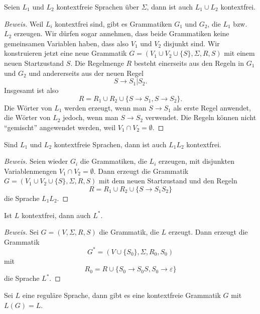 \begin{satz}[Vereinigung]
\label{satz:cfg-union}
%
Seien $L_1$ und $L_2$ kontextfreie Sprachen über $\Sigma$,
dann ist auch $L_1\cup L_2$ kontextfrei.
\end{satz}

\begin{proof}[Beweis]
Weil $L_i$ kontextfrei sind,  gibt es Grammatiken $G_1$ und $G_2$,
die $L_1$ bzw.~$L_2$ erzeugen. Wir dürfen sogar annehmen, dass
beide Grammatiken keine
gemeinsamen Variablen haben, dass also $V_1$ und $V_2$ 
disjunkt sind. Wir konstruieren jetzt eine neue Grammatik
$G=(V_1\cup V_2\cup\{S\}, \Sigma, R, S)$ mit einem neuen
Startzustand $S$. Die Regelmenge $R$ besteht einerseits aus
den Regeln in $G_1$ und $G_2$ und andererseits aus der neuen
Regel
\[
S\to S_1 | S_2.
\]
Insgesamt ist also
\[
R=R_1\cup R_2\cup \{S\to S_1, S\to S_2\}.
\]
Die Wörter von $L_1$ werden erzeugt, wenn man $S\to S_1$ als
erste Regel anwendet, die Wörter von $L_2$ jedoch, wenn 
man $S\to S_2$ verwendet. Die Regeln können nicht ``gemischt''
angewendet werden, weil $V_1\cap V_2=\emptyset$.
\end{proof}

\begin{satz}[Verkettung]
\label{satz:cfg-verkettung}
%
Sind $L_1$ und $L_2$ kontextfreie Sprachen, dann ist auch $L_1L_2$
kontextfrei.
\end{satz}

\begin{proof}[Beweis]
Seien wieder $G_i$ die Grammatiken, die $L_i$ erzeugen, mit disjunkten
Variablenmengen $V_1\cap V_2=\emptyset$. Dann erzeugt die Grammatik
$G=(V_1\cup V_2\cup\{S\},\Sigma, R,S)$ mit dem neuen Startzustand
und den Regeln
\[
R=R_1\cup R_2\cup \{S\to S_1S_2\}
\]
die Sprache $L_1L_2$.
\end{proof}

\begin{satz}[$*$-Operation]
%
\label{satz:cfg-star}
Ist $L$ kontextfrei, dann auch $L^*$.
\end{satz}

\begin{proof}[Beweis]
Sei $G=(V,\Sigma,R,S)$ die Grammatik, die $L$ erzeugt. Dann erzeugt die
Grammatik
\[
G^*=(V\cup \{S_0\}, \Sigma, R_0, S_0)
\]
mit
\[
R_0=R\cup \{ S_0\to S_0S, S_0\to\varepsilon \}
\]
die Sprache $L^*$.
\end{proof}

\begin{satz} Sei $L$ eine reguläre Sprache, dann gibt es eine
kontextfreie Grammatik $G$ mit $L(G)=L$.
\end{satz}

